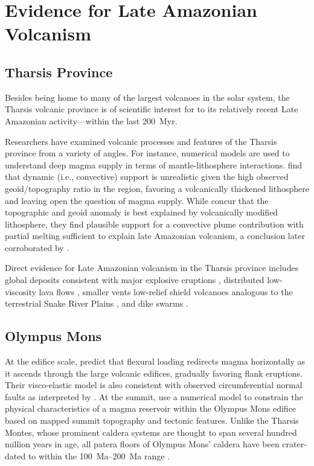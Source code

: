 \section{Evidence for Late Amazonian Volcanism}

\subsection{Tharsis Province}

Besides being home to many of the largest volcanoes in the solar system, the Tharsis volcanic province is of scientific interest for to its relatively recent Late Amazonian activity---within the last \qty{200}{Myr}.

Researchers have examined volcanic processes and features of the Tharsis province from a variety of angles. For instance, numerical models are used to understand deep magma supply in terms of mantle-lithosphere interactions. \textcite{roberts_plume-induced_2004} find that dynamic (i.e., convective) support is unrealistic given the high observed geoid/topography ratio in the region, favoring a volcanically thickened lithosphere and leaving open the question of magma supply. While \textcite{redmond_numerical_2004} concur that the topographic and geoid anomaly is best explained by volcanically modified lithosphere, they find plausible support for a convective plume contribution with partial melting sufficient to explain late Amazonian volcanism, a conclusion later corroborated by \textcite{plesa_thermal_2018}.

Direct evidence for Late Amazonian volcanism in the Tharsis province includes global deposits consistent with major explosive eruptions \parencite{hynek_explosive_2003}, distributed low-viscosity lava flows \parencite{hauber_very_2011}, smaller vents \parencite{wilson_fissure_2009,richardson_small_2021} low-relief shield volcanoes analogous to the terrestrial Snake River Plains \parencite{hauber_topography_2009}, and dike swarms \parencite{pieterek_late_2022}.

\subsection{Olympus Mons}

At the edifice scale, \textcite{mcgovern_state_1993} predict that flexural loading redirects magma horizontally as it ascends through the large volcanic edifices, gradually favoring flank eruptions. Their visco-elastic model is also consistent with observed circumferential normal faults as interpreted by \textcite{thomas_flank_1990}. At the summit, \textcite{zuber_caldera_1992} use a numerical model to constrain the physical characteristics of a magma reservoir within the Olympus Mons edifice based on mapped summit topography and tectonic features. Unlike the Tharsis Montes, whose prominent caldera systems are thought to span several hundred million years in age, all patera floors of Olympus Mons' caldera have been crater-dated to within the \qtyrange{100}{200}{Ma} range \parencite{neukum_recent_2004}.

